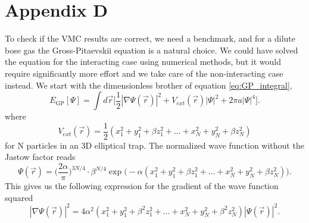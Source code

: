 \documentclass[norsk,a4paper,12pt]{article}
\begin{document}
\section*{Appendix D} \label{sec:appendix_d}
To check if the VMC results are correct, we need a benchmark, and for a dilute bose gas the Gross-Pitaevskii equation is a natural choice. We could have solved the equation for the interacting case using numerical methods, but it would require significantly more effort and we take care of the non-interacting case instead. We start with the dimensionless brother of equation \ref{eq:GP_integral},
\begin{equation}
E_{\text{GP}}[\Psi]=\int d\vec{r}\bigg[\frac{1}{2}|\nabla\Psi(\vec{r})|^2+V_{ext}(\vec{r})|\Psi|^2+2\pi a|\Psi|^4\bigg].
\end{equation}
where 
\begin{equation}
V_{ext}(\vec{r})=\frac{1}{2}(x_1^2+y_1^2+\beta z_1^2 + \hdots + x_N^2+y_N^2+\beta z_N^2)
\end{equation}
for N particles in an 3D elliptical trap. The normalized wave function without the Jastow factor reads
\begin{equation}
\Psi(\vec{r})=\bigg(\frac{2\alpha}{\pi}\bigg)^{3N/4}\cdot\beta^{N/4}\exp\big(-\alpha(x_1^2+y_1^2+\beta z_1^2 + \hdots + x_N^2+y_N^2+\beta z_N^2)\big).
\end{equation}
This gives us the following expression for the gradient of the wave function squared
\begin{equation}
|\nabla\Psi(\vec{r})|^2=4\alpha^2(x_1^2+y_1^2+\beta^2 z_1^2 + \hdots + x_N^2+y_N^2+\beta^2 z_N^2)|\Psi(\vec{r})|^2.
\end{equation}
\end{document}
